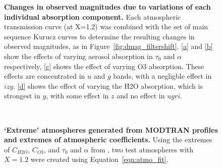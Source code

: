 \documentclass[12pt,preprint]{aastex}
\begin{document}
\begin{figure}
\caption{{\small
{\bf Changes in observed magnitudes due to variations of each
individual absorption component.} Each atmospheric transmission curve
(at X=1.2) was combined with the set of main sequence Kurucz curves to
determine the resulting changes in observed magnitudes, as in
Figure~\ref{fig:dmag_filtershift}. \ref{a} and \ref{b} show the
effects of varying aerosol absorption in $\tau_0$ and $\alpha$
respectively, \ref{c} shows the effect of varying O3 absorption. These
effects are concentrated in $u$ and $g$ bands, with a negligble effect
in $izy$. \ref{d} shows the effect of varying the H2O absorption,
which is strongest in $y$, with some effect in $z$ and no effect in
$ugri$.
}}
\label{fig:dmag_atm_comps}
\end{figure}

\begin{figure}
\centering
{} \\
\caption{{\small 
{\bf `Extreme' atmospheres generated from MODTRAN profiles and extremes 
of atmospheric coefficients.} Using the extremes of $C_{H2O}$, $C_{O3}$,
and $\tau_0$ and $\alpha$ from \citet{Burke2010b}, two test atmospheres
with $X=1.2$ were created using Equation~\ref{eqn:atmo_fit}. 
}}
\label{fig:atm_changes}
\end{figure}
\end{document}
